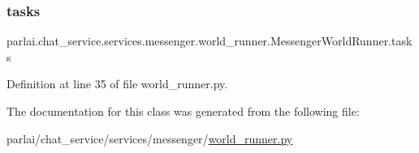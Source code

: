 \subsubsection{\texorpdfstring{tasks}{tasks}}
{\footnotesize\ttfamily parlai.\+chat\+\_\+service.\+services.\+messenger.\+world\+\_\+runner.\+Messenger\+World\+Runner.\+tasks}



Definition at line 35 of file world\+\_\+runner.\+py.



The documentation for this class was generated from the following file\+:\begin{DoxyCompactItemize}
\item 
parlai/chat\+\_\+service/services/messenger/\hyperlink{world__runner_8py}{world\+\_\+runner.\+py}\end{DoxyCompactItemize}
